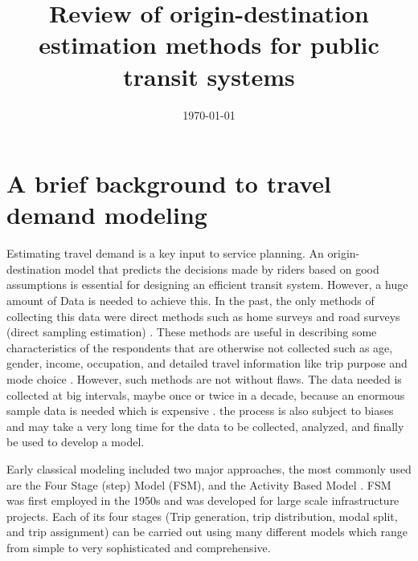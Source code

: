 \documentclass[11pt,twoside]{article}
\numberwithin{equation}{section}
\newcommand{\?}{\stackrel{?}{=}}
\begin{document}
\title{Review of origin-destination estimation methods for public transit systems}
\author{}
\date{\small\today}
\maketitle




\section{A brief background to travel demand modeling}




Estimating travel demand is a key input to service planning. An origin-destination model that predicts the decisions made by riders based on good assumptions is essential for designing an efficient transit system. However, a huge amount of Data is needed to achieve this. In the past, the only methods of collecting this data were direct methods such as home surveys and road surveys (direct sampling estimation) \citep{vitiStateofartODMatrix2008, netoStatisticalModelsEstimation2017}. These methods are useful in describing some characteristics of the respondents that are otherwise not collected such as age, gender, income, occupation, and detailed travel information like trip purpose and mode choice \citep{zannatEmergingBigData2019}. However, such methods are not without flaws. The data needed is collected at big intervals, maybe once or twice in a decade, because an enormous sample data is needed which is expensive \citep{netoStatisticalModelsEstimation2017}. the process is also subject to biases and may take a very long time for the data to be collected, analyzed, and finally be used to develop a model.

Early classical modeling included two major approaches, the most commonly used are the Four Stage (step) Model (FSM), and the Activity Based Model \citep{rasouliCriticalReviewCurrent2017, shanComparisonTripGeneration2012}. FSM was first employed in the 1950s and was developed for large scale infrastructure projects. Each of its four stages (Trip generation, trip distribution, modal split, and trip assignment) can be carried out using many different models which range from simple to very sophisticated and comprehensive. 
\end{document}
